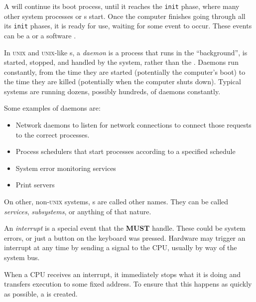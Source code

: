 A  will continue its boot process, until it reaches the \texttt{init} phase, where many other system processes or s start.
Once the computer finishes going through all its \texttt{init} phases, it is ready for use, waiting for some event to occur.
These events can be a   or a software .

\begin{definition}[Daemon]\label{def:Daemon}
  In \textsc{unix} and \textsc{unix}-like s, a \emph{daemon} is a  process that runs in the ``background'', is started, stopped, and handled by the system, rather than the .
  Daemons run constantly, from the time they are started (potentially the computer's boot) to the time they are killed (potentially when the computer shuts down).
  Typical systems are running dozens, possibly hundreds, of daemons constantly.

  Some examples of daemons are:
  \begin{itemize}[noitemsep]
  \item Network daemons to listen for network connections to connect those requests to the correct processes.
  \item Process schedulers that start processes according to a specified schedule
  \item System error monitoring services
  \item Print servers
  \end{itemize}

  \begin{remark}\label{rmk:Daemon_Other_Names}
    On other, non-\textsc{unix} systems, s are called other names.
    They can be called \emph{services}, \emph{subsystems}, or anything of that nature.
  \end{remark}
\end{definition}

\begin{definition}[Interrupt]\label{def:Interrupt}
  An \emph{interrupt} is a special event that the  \textbf{MUST} handle.
  These could be system errors, or just a button on the keyboard was pressed.
  Hardware may trigger an interrupt at any time by sending a signal to the CPU, usually by way of the system bus.

  When a CPU receives an interrupt, it immediately stops what it is doing and transfers execution to some fixed address.
  To ensure that this happens as quickly as possible, a  is created.
\end{definition}

